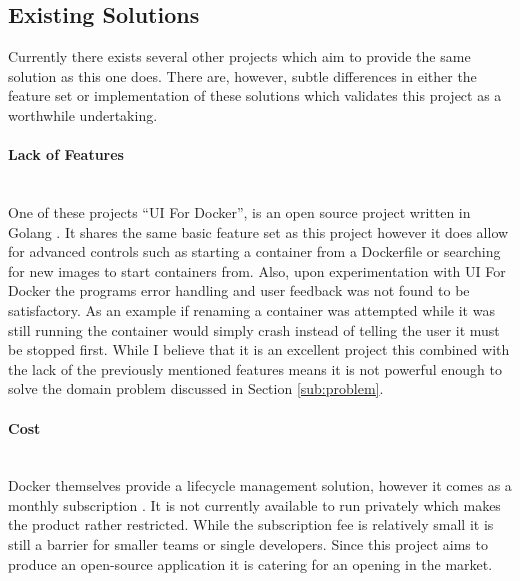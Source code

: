 \subsection{Existing Solutions}
Currently there exists several other projects which aim to provide the same solution as this one does. There are, however, subtle differences in either the feature set or implementation of these solutions which validates this project as a worthwhile undertaking. 

\paragraph{Lack of Features}\mbox{}\\
One of these projects ``UI For Docker'', is an open source project written in Golang \citep{UIRepo2016}. It shares the same basic feature set as this project however it does allow for advanced controls such as starting a container from a Dockerfile or searching for new images to start containers from. Also, upon experimentation with UI For Docker the programs error handling and user feedback was not found to be satisfactory. As an example if renaming a container was attempted while it was still running the container would simply crash instead of telling the user it must be stopped first. While I believe that it is an excellent project this combined with the lack of the previously mentioned features means it is not powerful enough to solve the domain problem discussed in Section \ref{sub:problem}. 

\paragraph{Cost}\mbox{}\\
Docker themselves provide a lifecycle management solution, however it comes as a monthly subscription \citep{Docker2016}. It is not currently available to run privately which makes the product rather restricted. While the subscription fee is relatively small it is still a barrier for smaller teams or single developers. Since this project aims to produce an open-source application it is catering for an opening in the market.
